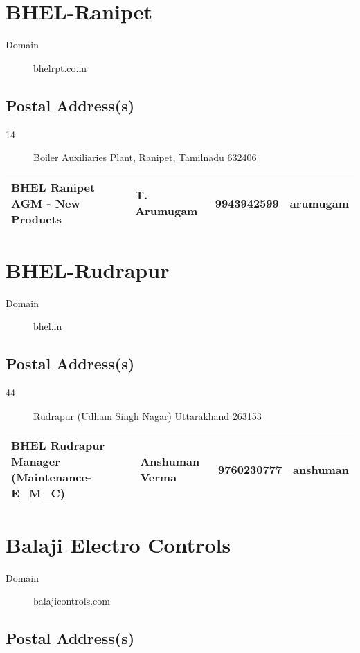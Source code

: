 \documentclass[a4paper, 11pt, twoside]{book}
\begin{document}
\section{BHEL-Ranipet}\label{com:14}
\begin{description}
\item[Domain]bhelrpt.co.in
\end{description}
\subsection*{Postal Address(s)}
\begin{description}
\item [14]Boiler Auxiliaries Plant, Ranipet, Tamilnadu 632406
\end{description}
\begin{tabular}{|p{4cm}|p{2cm}|p{2cm}|p{3cm}|}
\hline
BHEL Ranipet AGM - New Products & T. Arumugam & 9943942599 & arumugam \\ \hline
\end{tabular}
\section{BHEL-Rudrapur}\label{com:33}
\begin{description}
\item[Domain]bhel.in
\end{description}
\subsection*{Postal Address(s)}
\begin{description}
\item [44]Rudrapur (Udham Singh Nagar) Uttarakhand 263153
\end{description}
\begin{tabular}{|p{4cm}|p{2cm}|p{2cm}|p{3cm}|}
\hline
BHEL Rudrapur Manager (Maintenance-E\_M\_C) & Anshuman Verma & 9760230777 & anshuman \\ \hline
\end{tabular}
\section{Balaji Electro Controls}\label{com:50}
\begin{description}
\item[Domain]balajicontrols.com
\end{description}
\subsection*{Postal Address(s)}
\end{document}
